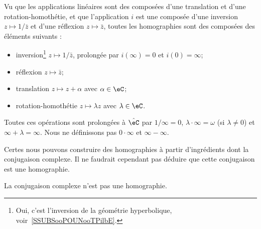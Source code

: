 \begin{normaltext}      \label{NORMooMMKOooQlzjqJ}
    Vu que les applications linéaires sont des composées d'une translation et d'une rotation-homothétie, et que l'application \( i\) est une composée d'une inversion \( z\mapsto 1/\bar z\) et d'une réflexion \( z\mapsto \bar z\), toutes les homographies sont des composées des éléments suivants :
    \begin{itemize}
        \item inversion\footnote{Oui, c'est l'inversion de la géométrie hyperbolique, voir~\ref{SSUBSooPOUNooTPilbE}.} \( z\mapsto 1/\bar z\), prolongée par \( i(\infty)=0\) et \( i(0)=\infty\);
        \item réflexion \( z\mapsto \bar z\);
        \item translation \( z\mapsto z+\alpha\) avec \( \alpha\in \eC\);
        \item rotation-homothétie \( z\mapsto \lambda z\) avec \( \lambda\in \eC\).
    \end{itemize}

    Toutes ces opérations sont prolongées à \( \hat\eC\) par \( 1/\infty=0\), \( \lambda\cdot \infty=\omega\) (si \( \lambda\neq 0\)) et \( \infty+\lambda=\infty\). Nous ne définissons pas \( 0\cdot \infty\) et \( \infty-\infty\).
\end{normaltext}

Certes nous pouvons construire des homographies à partir d'ingrédients dont la conjugaison complexe. Il ne faudrait cependant pas déduire que cette conjugaison est une homographie.

\begin{lemma}       \label{LEMooGDDJooBpJlUf}
    La conjugaison complexe n'est pas une homographie.
\end{lemma}

